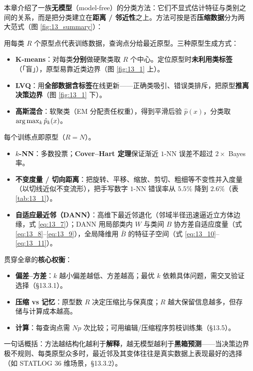 本章介绍了一族\textbf{无模型}（model-free）的分类方法：它们不显式估计特征与类别之间的关系，而是把分类建立在\textbf{距离 / 邻近性}之上。方法可按是否\textbf{压缩数据}分为两大范式（图 \ref{fig:13_summary}）：

\begin{description}[itemsep=2pt,leftmargin=1em]
\item[\textbf{原型方法}——压缩 $N\to R$：] 用每类 $R$ 个原型点代表训练数据，查询点分给最近原型。三种原型生成方式：
\begin{itemize}[itemsep=1pt]
\item \textbf{K-means}：对每类\textbf{分别}做硬聚类取 $R$ 个中心。定位原型时\textbf{未利用类标签}（「盲」），原型易靠近类边界（图 \ref{fig:13_1} 上）。
\item \textbf{LVQ}：用\textbf{全部数据含标签}在线更新——正确类吸引、错误类排斥，把原型\textbf{推离决策边界}（图 \ref{fig:13_1} 下）。
\item \textbf{高斯混合}：软聚类（EM 分配责任权重），得到平滑后验 $\hat p(x)$，分类取 $\arg\max_k \hat p_k(x)$。
\end{itemize}

\item[\textbf{最近邻方法}——记忆式、不压缩：] 每个训练点即原型（$R=N$）。
\begin{itemize}[itemsep=1pt]
\item \textbf{$k$-NN}：多数投票；\textbf{Cover--Hart 定理}保证渐近 $1$-NN 误差不超过 $2\times$ Bayes 率。
\item \textbf{不变度量 / 切向距离}：把旋转、平移、缩放、剪切、粗细等不变性并入度量（以切线近似不变流形），把手写数字 $1$-NN 错误率从 $5.5\%$ 降到 $2.6\%$（表 \ref{tab:13_1}）。
\item \textbf{自适应最近邻（DANN）}：高维下最近邻退化（邻域半径迅速逼近立方体边缘，式 \ref{eq:13_7}）；DANN 用局部类内 $W$ 与类间 $B$ 协方差自适应度量（式 \ref{eq:13_8}--\ref{eq:13_9}），全局降维用 $\bar B$ 的特征子空间（式 \ref{eq:13_10}--\ref{eq:13_11}）。
\end{itemize}
\end{description}

贯穿全章的\textbf{核心权衡}：
\begin{itemize}[itemsep=1pt]
\item \textbf{偏差--方差}：$k$ 越小偏差越低、方差越高；最优 $k$ 依赖具体问题，需交叉验证选择（§13.3.1）。
\item \textbf{压缩 vs 记忆}：原型数 $R$ 决定压缩比与保真度；$R$ 越大保留信息越多，但存储与计算成本越高。
\item \textbf{计算}：每查询点需 $Np$ 次比较；可用编辑/压缩程序剪枝训练集（§13.5）。
\end{itemize}

一句话概括：方法越结构化越利于\textbf{解释}，越无模型越利于\textbf{黑箱预测}——当决策边界极不规则、每类原型众多时，最近邻及其变体往往是真实数据上表现最好的选择（如 STATLOG 36 维场景，§13.3.2）。

